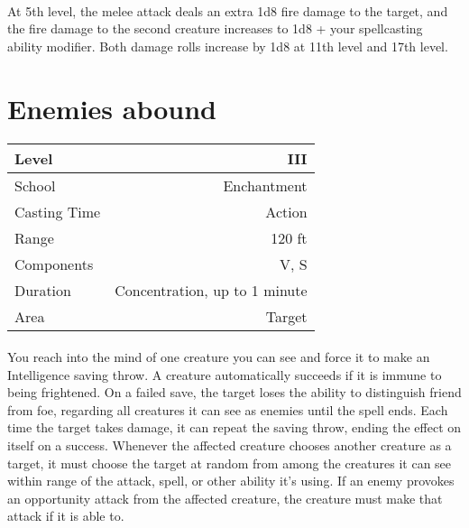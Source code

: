 \documentclass[a5paper,12pt]{article}
\begin{document}
\paragraph{}
At 5th level, the melee attack deals an extra 1d8 fire damage to the target, and the fire damage to the second creature increases to 1d8 + your spellcasting ability modifier. Both damage rolls increase by 1d8 at 11th level and 17th level.

\newpage

\section*{Enemies abound}
\begin{table}[h]
   \centering
   \begin{tabular}{|l|r|}
      \hline
      Level        & III \\
      \hline
      School       & Enchantment \\
      \hline
      Casting Time & Action \\
      \hline
      Range        & 120 ft \\
      \hline
      Components   & V, S \\
      \hline
      Duration     & Concentration, up to 1 minute\\
      \hline
      Area         & Target \\
      \hline
   \end{tabular}
\end{table}

\paragraph{}
You reach into the mind of one creature you can see and force it to make an Intelligence saving throw. A creature automatically succeeds if it is immune to being frightened. On a failed save, the target loses the ability to distinguish friend from foe, regarding all creatures it can see as enemies until the spell ends. Each time the target takes damage, it can repeat the saving throw, ending the effect on itself on a success. Whenever the affected creature chooses another creature as a target, it must choose the target at random from among the creatures it can see within range of the attack, spell, or other ability it’s using. If an enemy provokes an opportunity attack from the affected creature, the creature must make that attack if it is able to.

\newpage
\end{document}
